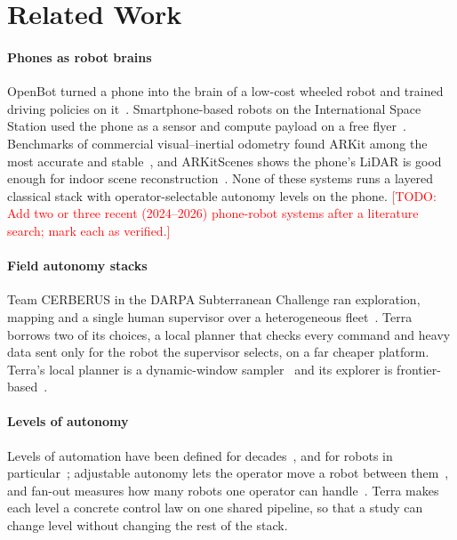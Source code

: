 \documentclass[conference]{IEEEtran}
\newcommand{\todo}[1]{\textcolor{red}{[TODO: #1]}}
\begin{document}
\section{Related Work}
\label{sec:related}

\paragraph{Phones as robot brains}
OpenBot turned a phone into the brain of a low-cost wheeled robot and trained driving policies on it~\cite{muller2021openbot}.
Smartphone-based robots on the International Space Station used the phone as a sensor and compute payload on a free flyer~\cite{fong2013smartspheres}.
Benchmarks of commercial visual--inertial odometry found ARKit among the most accurate and stable~\cite{kim2022benchmark}, and ARKitScenes shows the phone's LiDAR is good enough for indoor scene reconstruction~\cite{baruch2021arkitscenes}.
None of these systems runs a layered classical stack with operator-selectable autonomy levels on the phone.
\todo{Add two or three recent (2024--2026) phone-robot systems after a literature search; mark each as verified.}

\paragraph{Field autonomy stacks}
Team CERBERUS in the DARPA Subterranean Challenge ran exploration, mapping and a single human supervisor over a heterogeneous fleet~\cite{tranzatto2022scirob,tranzatto2022finals}.
Terra borrows two of its choices, a local planner that checks every command and heavy data sent only for the robot the supervisor selects, on a far cheaper platform.
Terra's local planner is a dynamic-window sampler~\cite{fox1997dwa} and its explorer is frontier-based~\cite{yamauchi1997frontier}.

\paragraph{Levels of autonomy}
Levels of automation have been defined for decades~\cite{sheridan1978verplank,parasuraman2000levels}, and for robots in particular~\cite{beer2014lora}; adjustable autonomy lets the operator move a robot between them~\cite{goodrich2001adjustable}, and fan-out measures how many robots one operator can handle~\cite{olsen2004fanout}.
Terra makes each level a concrete control law on one shared pipeline, so that a study can change level without changing the rest of the stack.
\end{document}
